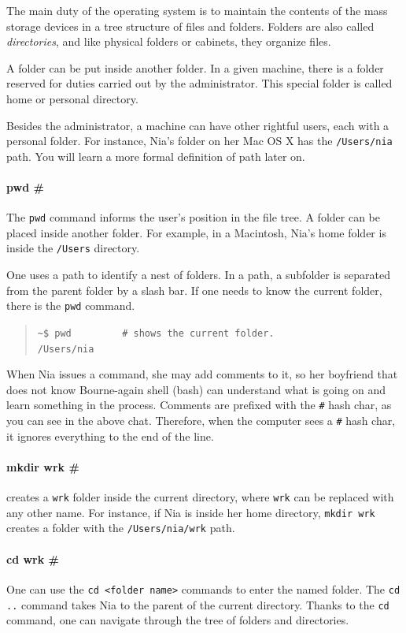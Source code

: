\documentclass[a4paper,12pt]{book}
\begin{document}
The main duty of the
operating system is to maintain the contents of
the mass storage devices in a tree structure
of files and folders.
Folders are also called {\em directories},
and like physical folders or cabinets,
they organize files.

A folder can be put inside another folder.
In a given machine, there is a folder 
reserved for duties carried out by the
administrator.
This special folder is called home
or personal directory.

Besides the administrator, a machine can
have other rightful users, each with
a personal folder. For instance, Nia's folder
on her Mac OS X has the \verb|/Users/nia|
path. You will learn a more formal
definition of path later on.


\paragraph{pwd \#} 
The \verb|pwd| command informs
the user's position in the file tree.
A folder can be placed
inside another folder.
For example, in a Macintosh, Nia's home
folder is inside the \verb|/Users| directory.

One uses a path to identify
a nest of folders. In a path, a subfolder
is separated from the parent folder
by a slash bar. If one needs to know
the current folder, there is the \verb|pwd|
command. 
\begin{quote}
\verb|~$ pwd         # shows the current folder. |\\
\verb|/Users/nia|\\
\end{quote}
When Nia issues a command, she may
add comments to it, so her boyfriend that
does not know Bourne-again shell (bash)
can understand what
is going on and learn something in
the process. Comments are prefixed
with the \verb|#| hash char, as you
can see in the above chat. Therefore,
when the computer sees a \verb|#|
hash char, it ignores everything to
the end of the line.

\paragraph{mkdir wrk \#}
creates a \verb|wrk|
folder inside the current directory,
where \verb|wrk| can be replaced
with any other name.
For instance, if Nia is inside her
home directory, \verb|mkdir wrk| creates
a folder with the \verb|/Users/nia/wrk| path.

\paragraph{cd wrk \#} 
One can use the
\verb|cd <folder name>| commands to enter
the named folder.
The \verb|cd ..|  command
takes Nia to the parent of the current
directory.
Thanks to the \verb|cd|
command, one can navigate through the
tree of folders and directories.
\end{document}
